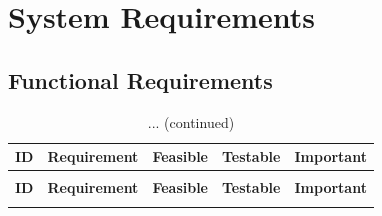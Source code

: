 \documentclass[a4paper]{article}
\begin{document}
\newpage
\section{System Requirements}

\subsection{Functional Requirements}
\begin{longtable}{@{}
    >{\raggedright\arraybackslash}p{}
    p{}
    >{\centering\arraybackslash}p{}
    >{\centering\arraybackslash}p{}
    >{\raggedright\arraybackslash}p{} @{}}

    \caption{Functional Requirements}
    \label{tab:functional_requirements} \\

    \toprule
    \textbf{ID} & \textbf{Requirement} & \textbf{Feasible} & \textbf{Testable} & \textbf{Important} \\
    \midrule
    \endfirsthead

    \caption[]{... (continued)} \\
    \toprule
    \textbf{ID} & \textbf{Requirement} & \textbf{Feasible} & \textbf{Testable} & \textbf{Important} \\
    \midrule
    \endhead

    \bottomrule
    \endlastfoot


\end{longtable}
\end{document}
